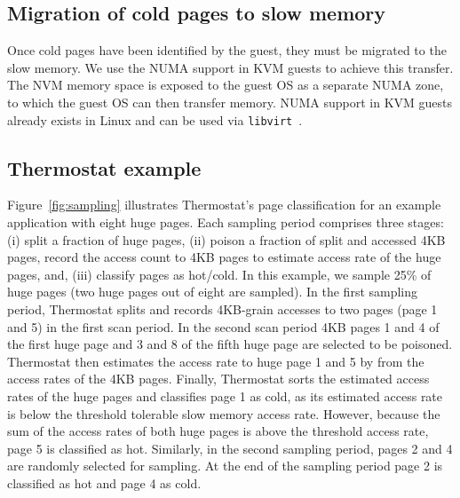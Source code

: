 \subsection{Migration of cold pages to slow memory}
Once cold pages have been identified by the guest, they must be migrated to 
the slow memory. We use the NUMA support in KVM guests to achieve this transfer. The NVM
memory space is exposed to the guest OS as a separate NUMA zone, to which the guest
OS can then transfer memory. NUMA support in KVM guests already exists in Linux
and can be used via {\tt libvirt}~\cite{libvirt-numa}.

\subsection{Thermostat example}
Figure~\ref{fig:sampling} illustrates Thermostat's page classification for an
example application with eight huge pages. Each sampling period comprises 
three stages: (i) split a fraction of huge pages, (ii) poison a fraction of split and
accessed 4KB pages, record the access count to 4KB pages to estimate access rate
of the huge pages, and, (iii) classify pages as hot/cold. In this example, we sample 25\% of
huge pages (two huge pages out of eight are sampled). In the first sampling
period, Thermostat splits and records 4KB-grain accesses to two pages (page 1
and 5) in the first scan period. In the second scan period 4KB pages 1 and 4
of the first huge page and 3 and 8 of the fifth huge page are selected to be poisoned.
Thermostat then estimates the access rate to huge page 1 and 5 by from the access rates
of the 4KB pages.  Finally, Thermostat sorts the estimated access rates of the huge pages
and classifies page 1 as cold, as its estimated access rate is below
the threshold tolerable slow memory access rate. However, because the sum of the
access rates of both huge pages is above the threshold access rate, page 5 is classified
as hot. Similarly, in the second sampling period, pages 2 and 4 are randomly
selected for sampling. At the end of the sampling period page 2 is classified as
hot and page 4 as cold.

